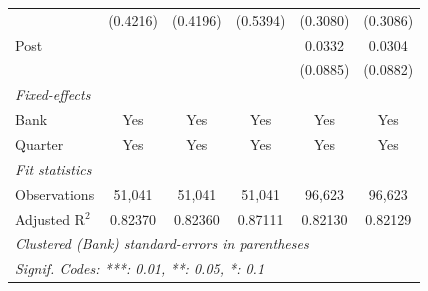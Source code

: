 \begin{tabular}{lccccc}
                                   & (0.4216)       & (0.4196)       & (0.5394)      & (0.3080)        & (0.3086)\\   
   Post                            &                &                &               & 0.0332          & 0.0304\\   
                                   &                &                &               & (0.0885)        & (0.0882)\\   
   \midrule
   \emph{Fixed-effects}\\
   Bank                            & Yes            & Yes            & Yes           & Yes             & Yes\\  
   Quarter                         & Yes            & Yes            & Yes           & Yes             & Yes\\  
   \midrule
   \emph{Fit statistics}\\
   Observations                    & 51,041         & 51,041         & 51,041        & 96,623          & 96,623\\  
   Adjusted R$^2$                  & 0.82370        & 0.82360        & 0.87111       & 0.82130         & 0.82129\\  
   \midrule \midrule
   \multicolumn{6}{l}{\emph{Clustered (Bank) standard-errors in parentheses}}\\
   \multicolumn{6}{l}{\emph{Signif. Codes: ***: 0.01, **: 0.05, *: 0.1}}\\
\end{tabular}
\par\endgroup


